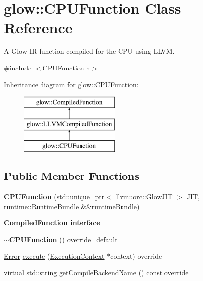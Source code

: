 \hypertarget{classglow_1_1_c_p_u_function}{}\section{glow\+:\+:C\+P\+U\+Function Class Reference}
\label{classglow_1_1_c_p_u_function}


A Glow IR function compiled for the C\+PU using L\+L\+VM.  




{\ttfamily \#include $<$C\+P\+U\+Function.\+h$>$}

Inheritance diagram for glow\+:\+:C\+P\+U\+Function\+:\begin{figure}[H]
\begin{center}
\leavevmode
\includegraphics[height=3.000000cm]{classglow_1_1_c_p_u_function}
\end{center}
\end{figure}
\subsection*{Public Member Functions}
\begin{DoxyCompactItemize}
\item 
\mbox{\label{classglow_1_1_c_p_u_function_a92ad5e9bfee881abc4d80bdafb81dcf7}} 
{\bfseries C\+P\+U\+Function} (std\+::unique\+\_\+ptr$<$ \hyperlink{classllvm_1_1orc_1_1_glow_j_i_t}{llvm\+::orc\+::\+Glow\+J\+IT} $>$ J\+IT, \hyperlink{classglow_1_1runtime_1_1_runtime_bundle}{runtime\+::\+Runtime\+Bundle} \&\&runtime\+Bundle)
\end{DoxyCompactItemize}
\begin{Indent}\textbf{ Compiled\+Function interface}\par
\begin{DoxyCompactItemize}
\item 
\mbox{\label{classglow_1_1_c_p_u_function_aca761127a8fdbd1b79bb4a8f98bdc03e}} 
{\bfseries $\sim$\+C\+P\+U\+Function} () override=default
\item 
\hyperlink{namespaceglow_afdb176c3a672ef66db0ecfc19a8d39bf}{Error} \hyperlink{classglow_1_1_c_p_u_function_a31625d840ca33030c6762955c93d82a1}{execute} (\hyperlink{classglow_1_1_execution_context}{Execution\+Context} $\ast$context) override
\item 
virtual std\+::string \hyperlink{classglow_1_1_c_p_u_function_a4bf0faf1e98bcf21ec058c031df3c036}{get\+Compile\+Backend\+Name} () const override
\end{DoxyCompactItemize}
\end{Indent}
